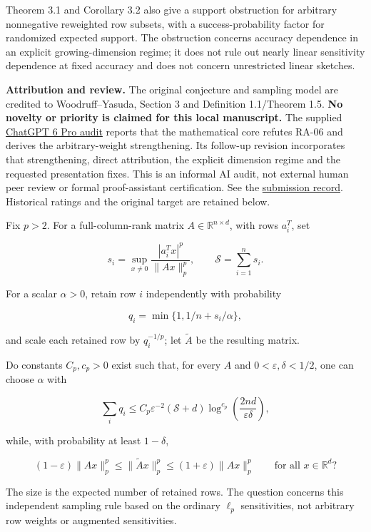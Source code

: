 \documentclass[11pt,a4paper]{article}
\begin{document}
Theorem 3.1 and Corollary 3.2 also give a support obstruction for
arbitrary nonnegative reweighted row subsets, with a success-probability
factor for randomized expected support. The obstruction concerns
accuracy dependence in an explicit growing-dimension regime; it does not
rule out nearly linear sensitivity dependence at fixed accuracy and does
not concern unrestricted linear sketches.

\textbf{Attribution and review.} The original conjecture and sampling
model are credited to Woodruff--Yasuda, Section 3 and Definition
1.1/Theorem 1.5. \textbf{No novelty or priority is claimed for this
local manuscript.} The supplied
\href{https://chatgpt.com/share/6abd3ea9-6310-83ed-8d37-edc449055572}{ChatGPT
6 Pro audit} reports that the mathematical core refutes RA-06 and
derives the arbitrary-weight strengthening. Its follow-up revision
incorporates that strengthening, direct attribution, the explicit
dimension regime and the requested presentation fixes. This is an
informal AI audit, not external human peer review or formal
proof-assistant certification. See the
\href{https://github.com/ajt60gaibb/OpenProblemsInNLA/blob/main/references/haidary-resolutions-2026-09-30/README.md}{submission
record}. Historical ratings and the original target are retained below.

Fix \(p>2\). For a full-column-rank matrix
\(A\in\mathbb R^{n\times d}\), with rows \(a_i^T\), set

\[s_i=\sup_{x\ne0}\frac{|a_i^Tx|^p}{\|Ax\|_p^p},\qquad
\mathcal S=\sum_{i=1}^n s_i.\]

For a scalar \(\alpha>0\), retain row \(i\) independently with
probability

\[q_i=\min\{1,1/n+s_i/\alpha\},\]

and scale each retained row by \(q_i^{-1/p}\); let \(\widetilde A\) be
the resulting matrix.

Do constants \(C_p,c_p>0\) exist such that, for every \(A\) and
\(0<\varepsilon,\delta<1/2\), one can choose \(\alpha\) with

\[\sum_iq_i\leq C_p\varepsilon^{-2}(\mathcal S+d)
\log^{c_p}\!\left(\frac{2nd}{\varepsilon\delta}\right),\]

while, with probability at least \(1-\delta\),

\[(1-\varepsilon)\|Ax\|_p^p\leq\|\widetilde Ax\|_p^p
\leq(1+\varepsilon)\|Ax\|_p^p
\qquad\text{for all }x\in\mathbb R^d?\]

The size is the expected number of retained rows. The question concerns
this independent sampling rule based on the ordinary \(\ell_p\)
sensitivities, not arbitrary row weights or augmented sensitivities.
\end{document}
